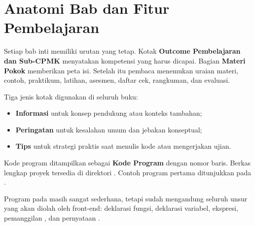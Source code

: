 \section{Anatomi Bab dan Fitur Pembelajaran}
\label{sec:ch01-anatomi}

Setiap bab inti memiliki urutan yang tetap. Kotak \textbf{Outcome
Pembelajaran dan Sub-CPMK} menyatakan kompetensi yang harus dicapai.
Bagian \textbf{Materi Pokok} memberikan peta isi. Setelah itu pembaca
menemukan uraian materi, contoh, praktikum, latihan, asesmen, daftar
cek, rangkuman, dan evaluasi.

Tiga jenis kotak digunakan di seluruh buku:
\begin{itemize}[leftmargin=*]
  \item \textbf{Informasi} untuk konsep pendukung atau konteks tambahan;
  \item \textbf{Peringatan} untuk kesalahan umum dan jebakan konseptual;
  \item \textbf{Tips} untuk strategi praktis saat menulis kode atau
        mengerjakan ujian.
\end{itemize}

Kode program ditampilkan sebagai \textbf{Kode Program} dengan nomor
baris. Berkas lengkap proyek tersedia di direktori .
Contoh program pertama ditunjukkan pada .


Program pada  masih sangat sederhana, tetapi
sudah mengandung seluruh unsur yang akan diolah oleh front-end:
deklarasi fungsi, deklarasi variabel, ekspresi, pemanggilan
, dan pernyataan .
